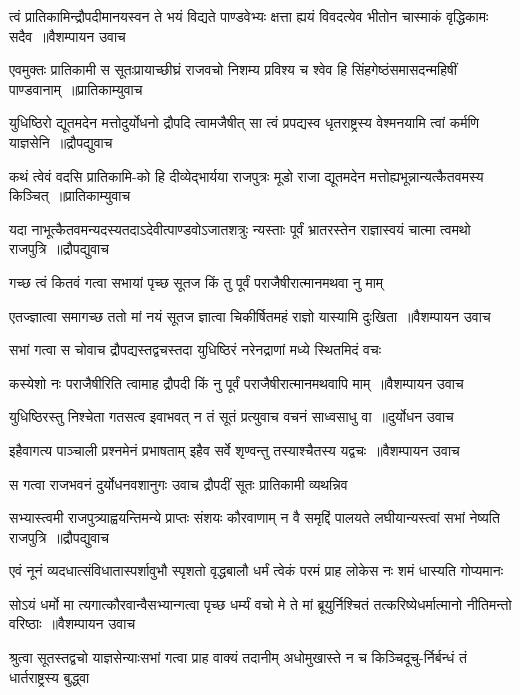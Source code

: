 \twolineshloka
{त्वं प्रातिकामिन्द्रौपदीमानयस्वन ते भयं विद्यते पाण्डवेभ्यः}
{क्षत्ता ह्ययं विवदत्येव भीतोन चास्माकं वृद्धिकामः सदैव ॥वैशम्पायन उवाच}


\threelineshloka
{एवमुक्तः प्रातिकामी स सूतःप्रायाच्छीघ्रं राजवचो निशम्य}
{प्रविश्य च श्वेव हि सिंहगेष्ठंसमासदन्महिषीं पाण्डवानाम् ॥प्रातिकाम्युवाच}
{}


\twolineshloka
{युधिष्ठिरो द्यूतमदेन मत्तोदुर्योधनो द्रौपदि त्वामजैषीत्}
{सा त्वं प्रपद्यस्व धृतराष्ट्रस्य वेश्मनयामि त्वां कर्मणि याज्ञसेनि ॥द्रौपद्युवाच}


\twolineshloka
{कथं त्वेवं वदसि प्रातिकामि-को हि दीव्येद्भार्यया राजपुत्रः}
{मूडो राजा द्यूतमदेन मत्तोह्यभून्नान्यत्कैतवमस्य किञ्चित् ॥प्रातिकाम्युवाच}


\twolineshloka
{यदा नाभूत्कैतवमन्यदस्यतदाऽदेवीत्पाण्डवोऽजातशत्रुः}
{न्यस्ताः पूर्वं भ्रातरस्तेन राज्ञास्वयं चात्मा त्वमथो राजपुत्रि ॥द्रौपद्युवाच}


\twolineshloka
{गच्छ त्वं कितवं गत्वा सभायां पृच्छ सूतज}
{किं तु पूर्वं पराजैषीरात्मानमथवा नु माम्}


\twolineshloka
{एतज्ज्ञात्वा समागच्छ ततो मां नयं सूतज}
{ज्ञात्वा चिकीर्षितमहं राज्ञो यास्यामि दुःखिता ॥वैशम्पायन उवाच}


\twolineshloka
{सभां गत्वा स चोवाच द्रौपद्यस्तद्वचस्तदा}
{युधिष्ठिरं नरेनद्राणां मध्ये स्थितमिदं वचः}


\twolineshloka
{कस्येशो नः पराजैषीरिति त्वामाह द्रौपदी}
{किं नु पूर्वं पराजैषीरात्मानमथवापि माम् ॥वैशम्पायन उवाच}


\twolineshloka
{युधिष्ठिरस्तु निश्चेता गतसत्व इवाभवत्}
{न तं सूतं प्रत्युवाच वचनं साध्वसाधु वा ॥दुर्योधन उवाच}


\twolineshloka
{इहैवागत्य पाञ्चाली प्रश्नमेनं प्रभाषताम्}
{इहैव सर्वे शृण्वन्तु तस्याश्चैतस्य यद्वचः ॥वैशम्पायन उवाच}


\twolineshloka
{स गत्वा राजभवनं दुर्योधनवशानुगः}
{उवाच द्रौपदीं सूतः प्रातिकामी व्यथन्निव}


\twolineshloka
{सभ्यास्त्वमी राजपुत्र्याह्वयन्तिमन्ये प्राप्तः संशयः कौरवाणाम्}
{न वै समृद्दिं पालयते लघीयान्यस्त्वां सभां नेष्यति राजपुत्रि ॥द्रौपद्युवाच}


\twolineshloka
{एवं नूनं व्यदधात्संविधातास्पर्शावुभौ स्पृशतो वृद्धबालौ}
{धर्मं त्वेकं परमं प्राह लोकेस नः शमं धास्यति गोप्यमानः}


\twolineshloka
{सोऽयं धर्मो मा त्यगात्कौरवान्वैसभ्यान्गत्वा पृच्छ धर्म्यं वचो मे}
{ते मां ब्रूयुर्निश्चितं तत्करिष्येधर्मात्मानो नीतिमन्तो वरिष्ठाः ॥वैशम्पायन उवाच}


\twolineshloka
{श्रुत्वा सूतस्तद्वचो याज्ञसेन्याःसभां गत्वा प्राह वाक्यं तदानीम्}
{अधोमुखास्ते न च किञ्चिदूचु-र्निर्बन्धं तं धार्तराष्ट्रस्य बुद्ध्वा}


